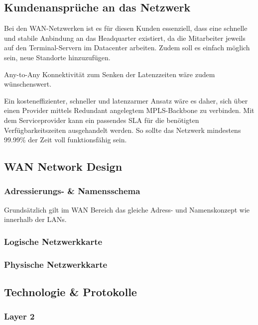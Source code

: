 \subsection{Kundenansprüche an das Netzwerk}

Bei den WAN-Netzwerken ist es für diesen Kunden essenziell, dass eine schnelle und stabile Anbindung an das Headquarter existiert, da die Mitarbeiter jeweils auf den Terminal-Servern im Datacenter arbeiten. Zudem soll es einfach möglich sein, neue Standorte hinzuzufügen.

Any-to-Any Konnektivität zum Senken der Latenzzeiten wäre zudem wünschenswert.

Ein kosteneffizienter, schneller und latenzarmer Ansatz wäre es daher, sich über einen Provider mittels Redundant angelegtem MPLS-Backbone zu verbinden. Mit dem Serviceprovider kann ein passendes SLA für die benötigten Verfügbarkeitszeiten ausgehandelt werden. So sollte das Netzwerk mindestens 99.99\% der Zeit voll funktionsfähig sein.

\subsection{WAN Network Design}

\subsubsection{Adressierungs- \& Namensschema}

Grundsätzlich gilt im WAN Bereich das gleiche Adress- und Namenskonzept wie innerhalb der LANs.

\subsubsection{Logische Netzwerkkarte}
\subsubsection{Physische Netzwerkkarte}

\subsection{Technologie \& Protokolle}
\subsubsection{Layer 2}
